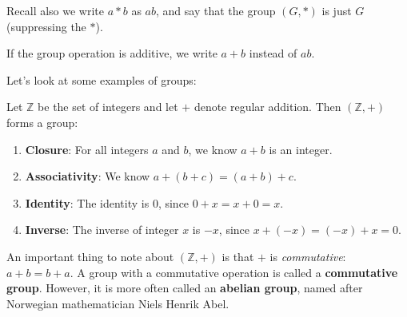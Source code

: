 Recall also we write $a \ast b$ as $ab$, and say that the group $(G, \ast)$ is just $G$ (suppressing the $\ast$).

\begin{remark}
    If the group operation is additive, we write $a + b$ instead of $ab$.
\end{remark}

Let's look at some examples of groups:
\begin{example}
    Let $\mathbb{Z}$ be the set of integers and let $+$ denote regular addition. Then $(\mathbb{Z}, +)$ forms a group:
    \begin{enumerate}
        \item \textbf{Closure}: For all integers $a$ and $b$, we know $a + b$ is an integer.
        \item \textbf{Associativity}: We know $a + (b + c) = (a + b) + c$.
        \item \textbf{Identity}: The identity is 0, since $0 + x = x + 0 = x$.
        \item \textbf{Inverse}: The inverse of integer $x$ is $-x$, since $x + (-x) = (-x) + x = 0$.
    \end{enumerate}
\end{example}

An important thing to note about $(\mathbb{Z}, +)$ is that $+$ is \textit{commutative}: $a + b = b + a$. A group with a commutative operation is called a \textbf{commutative group}. However, it is more often called an \textbf{abelian group}, named after Norwegian mathematician Niels Henrik Abel.

